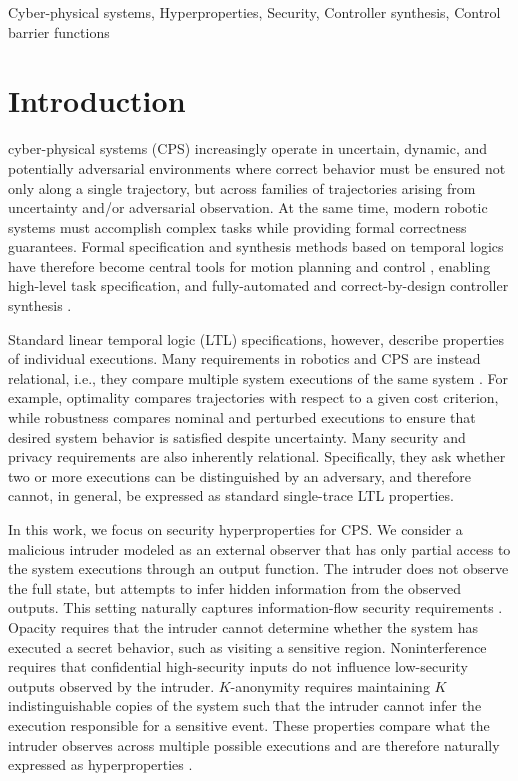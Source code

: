 \documentclass[journal,twoside,web]{ieeecolor}
\begin{document}
\begin{IEEEkeywords}
    Cyber-physical systems, Hyperproperties, Security, Controller synthesis, Control barrier functions
\end{IEEEkeywords}

\section{Introduction}
\label{sec:introduction}

 cyber-physical systems (CPS) increasingly operate in uncertain, dynamic, and potentially adversarial environments where correct behavior must be ensured not only along a single trajectory, but across families of trajectories arising from uncertainty and/or adversarial observation. At the same time, modern robotic systems must accomplish complex tasks while providing formal correctness guarantees. Formal specification and synthesis methods based on temporal logics have therefore become central tools for motion planning and control \cite{fainekos2009, kloetzer2008}, enabling high-level task specification, and fully-automated and correct-by-design controller synthesis \cite{smith2011}.

Standard linear temporal logic (LTL) specifications, however, describe properties of individual executions. Many requirements in robotics and CPS are instead relational, i.e., they compare multiple system executions of the same system \cite{wang2020}. For example, optimality compares trajectories with respect to a given cost criterion, while robustness compares nominal and perturbed executions to ensure that desired system behavior is satisfied despite uncertainty.
Many security and privacy requirements are also inherently relational. Specifically, they ask whether two or more executions can be distinguished by an adversary, and therefore cannot, in general, be expressed as standard single-trace LTL properties.

In this work, we focus on security hyperproperties for CPS. We consider a malicious intruder modeled as an external observer that has only partial access to the system executions through an output function. The intruder does not observe the full state, but attempts to infer hidden information from the observed outputs. This setting naturally captures information-flow security requirements \cite{zhao2024}. Opacity \cite{saboori2007} requires that the intruder cannot determine whether the system has executed a secret behavior, such as visiting a sensitive region.
Noninterference \cite{xiang2021} requires that confidential high-security inputs do not influence low-security outputs observed by the intruder. 
$K$-anonymity \cite{yin2016} requires maintaining $K$ indistinguishable copies of the system such that the intruder cannot infer the execution responsible for a sensitive event. These properties compare what the intruder observes across multiple possible executions and are therefore naturally expressed as hyperproperties \cite{clarkson2010}.
\end{document}
